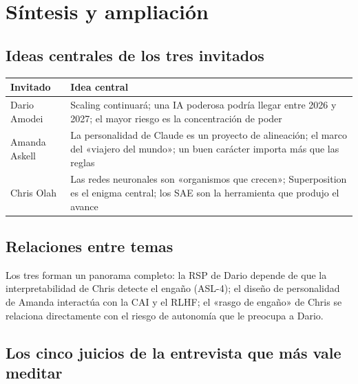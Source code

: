 \section{Síntesis y ampliación}

\subsection{Ideas centrales de los tres invitados}

\begin{table}[H]
\centering
\begin{tabular}{lp{10cm}}
\toprule
\textbf{Invitado} & \textbf{Idea central} \\
\midrule
Dario Amodei & Scaling continuará; una IA poderosa podría llegar entre 2026 y 2027; el mayor riesgo es la concentración de poder \\
Amanda Askell & La personalidad de Claude es un proyecto de alineación; el marco del «viajero del mundo»; un buen carácter importa más que las reglas \\
Chris Olah & Las redes neuronales son «organismos que crecen»; Superposition es el enigma central; los SAE son la herramienta que produjo el avance \\
\bottomrule
\end{tabular}
\end{table}

\subsection{Relaciones entre temas}

Los tres forman un panorama completo: la RSP de Dario depende de que la interpretabilidad de Chris detecte el engaño (ASL-4); el diseño de personalidad de Amanda interactúa con la CAI y el RLHF; el «rasgo de engaño» de Chris se relaciona directamente con el riesgo de autonomía que le preocupa a Dario.

\subsection{Los cinco juicios de la entrevista que más vale meditar}

